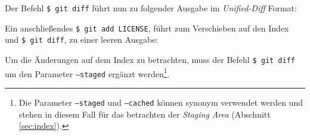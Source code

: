 
Der Befehl \texttt{\$ git diff} führt nun zu folgender Ausgabe im \textit{Unified-Diff}
Format:


Ein anschließendes \texttt{\$ git add LICENSE}, führt zum Verschieben auf den
Index und \texttt{\$ git diff}, zu einer leeren Ausgabe:


Um die Änderungen auf dem Index zu betrachten, muss der Befehl \texttt{\$ git
diff} um den Parameter \texttt{--staged} ergänzt werden\footnote{Die Parameter
\texttt{--staged} und \texttt{--cached} können synonym verwendet
werden und stehen in diesem Fall für das betrachten der \textit{Staging
Area} (Abschnitt \ref{sec:index}).}. \cite[26-29]{progit}
